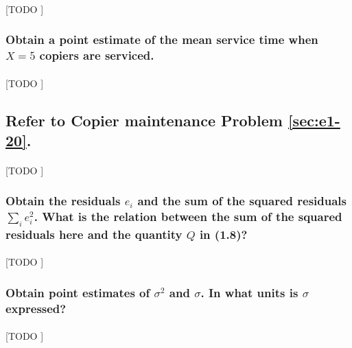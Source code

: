 \documentclass{article}
\begin{document}
        \paragraph{}
        [TODO ]

      \subsubsection{Obtain a point estimate of the mean service time when $X = 5$ copiers are serviced.}

        \paragraph{}
        [TODO ]

    \setcounter{subsection}{23}
    \subsection{Refer to \textbf{Copier maintenance} Problem \ref{sec:e1-20}.}

      \paragraph{}
      [TODO ]

      \subsubsection{Obtain the residuals $e_i$ and the sum of the squared residuals $\sum_i e_i^2$. What is the relation between the sum of the squared residuals here and the quantity $Q$ in (1.8)?}

        \paragraph{}
        [TODO ]

      \subsubsection{Obtain point estimates of $\sigma^2$ and $\sigma$. In what units is $\sigma$ expressed?}

        \paragraph{}
        [TODO ]

    \setcounter{section}{2}

    \setcounter{subsection}{4}
\end{document}
